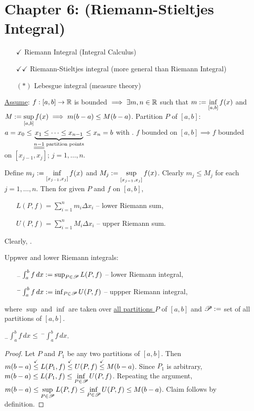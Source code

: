 \documentclass[]{article}
\begin{document}
\section*{Chapter 6: (Riemann-Stieltjes Integral)}

\begin{enumerate}
	\item[$\checkmark$] Riemann Integral (Integral Calculus)
	\item[$\checkmark\checkmark$] Riemann-Stieltjes integral (more general than Riemann Integral)
	\item[$(*)$] Lebesgue integral (measure theory)
\end{enumerate}
\ul{Assume}: $f:[a,b]\ra\mb R$ is bounded $\implies \exists m,n\in\mb R$ such that $\ds m:=\inf_{[a,b]} f(x)$ and $\ds M:=\sup_{[a,b]}f(x) \implies m(b-a) \leq M(b-a)$.
Partition $P$ of $[a,b]$: $a=x_0\leq \ub{\ul{\ul{n-1}}\text{ partition points}}{x_1\leq\dots\leq x_{n-1}}\leq x_n=b$ with .
$f$ bounded on $[a,b]\implies f$ bounded on $[x_{j-1},x_j]$; $j=1,\dots,n$.

Define $\ds m_j := \inf_{[x_{j-1},x_j]}f(x)$ and $\ds M_j:=\sup_{[x_{j-1},x_j]}f(x)$.
Clearly $m_j\leq M_j$ for each $j=1,\dots,n$.
\newpage
Then for given $P$ and $f$ on $[a,b]$,
\begin{enumerate}
	\item[] $L(P,f) = \sum_{i=1}^n m_i\Delta x_i$ -- lower Riemann sum,
	\item[] $U(P,f) = \sum_{i=1}^n M_i\Delta x_i$ -- upper Riemann sum.
\end{enumerate}
Clearly, .

Uppwer and lower Riemann integrals:
\begin{enumerate}
	\item[] $_-\int_a^b f\,dx := \sup_{P\in\ms P} L(P,f)$ -- lower Riemann integral,
	\item[] $^-\int_a^b f\,dx := \inf_{P\in\ms P} U(P,f)$ -- uppper Riemann integral,
\end{enumerate}
where $\sup$ and $\inf$ are taken over \ul{all partitions $P$} of $[a,b]$ and $\ms P := $ set of all partitions of $[a,b]$.

\begin{lemma}
	$ _-\int_a^bf\,dx\leq\, ^-\int_a^bf\,dx$.
\end{lemma}
\begin{proof}
	Let $P$ and $P_1$ be any two partitions of $[a,b]$. Then $m(b-a)\os\checkmark\leq L(P_1,f) \os\checkmark\leq U(P,f) \os\checkmark\leq M(b-a)$.
	Since $P_1$ is arbitrary, $\ds m(b-a)\leq L(P_1,f) \leq \inf_{P\in\ms P} U(P,f)$.
	Repeating the argument, $\ds m(b-a)\leq \sup_{P\in\ms P} L(P,f) \leq \inf_{P\in\ms P} U(P,f) \leq M(b-a)$.
	Claim follows by definition.
\end{proof}
\end{document}
